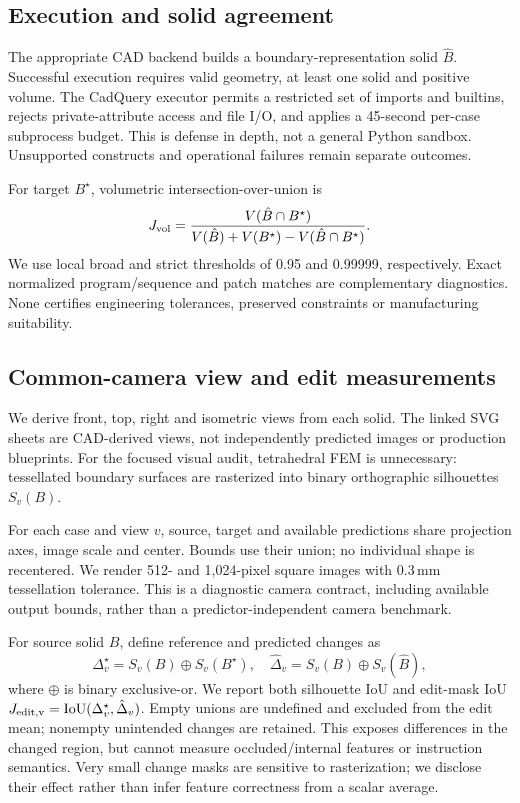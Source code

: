 \subsection{Execution and solid agreement}
The appropriate CAD backend builds a boundary-representation solid $\hat B$. Successful execution requires valid geometry, at least one solid and positive volume. The CadQuery executor permits a restricted set of imports and builtins, rejects private-attribute access and file I/O, and applies a 45-second per-case subprocess budget. This is defense in depth, not a general Python sandbox. Unsupported constructs and operational failures remain separate outcomes.

For target $B^\star$, volumetric intersection-over-union is
\begin{equation}
J_{\rm vol}=\frac{V(\hat B\cap B^\star)}{V(\hat B)+V(B^\star)-V(\hat B\cap B^\star)}.
\end{equation}
We use local broad and strict thresholds of 0.95 and 0.99999, respectively. Exact normalized program/sequence and patch matches are complementary diagnostics. None certifies engineering tolerances, preserved constraints or manufacturing suitability.

\subsection{Common-camera view and edit measurements}
We derive front, top, right and isometric views from each solid. The linked SVG sheets are CAD-derived views, not independently predicted images or production blueprints. For the focused visual audit, tetrahedral FEM is unnecessary: tessellated boundary surfaces are rasterized into binary orthographic silhouettes $S_v(B)$.

For each case and view $v$, source, target and available predictions share projection axes, image scale and center. Bounds use their union; no individual shape is recentered. We render 512- and 1,024-pixel square images with 0.3\,mm tessellation tolerance. This is a diagnostic camera contract, including available output bounds, rather than a predictor-independent camera benchmark.

For source solid $B$, define reference and predicted changes as
\begin{equation}
\Delta_v^\star=S_v(B)\oplus S_v(B^\star),\quad
\hat\Delta_v=S_v(B)\oplus S_v(\hat B),
\end{equation}
where $\oplus$ is binary exclusive-or. We report both silhouette IoU and edit-mask IoU $J_{\rm edit,v}=\operatorname{IoU}(\Delta_v^\star,\hat\Delta_v)$. Empty unions are undefined and excluded from the edit mean; nonempty unintended changes are retained. This exposes differences in the changed region, but cannot measure occluded/internal features or instruction semantics. Very small change masks are sensitive to rasterization; we disclose their effect rather than infer feature correctness from a scalar average.


